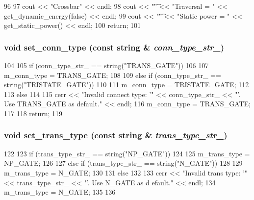 \begin{DoxyCode}
96 {
97     cout << "Crossbar" << endl;
98     cout << "\t" << "Traversal = " << get_dynamic_energy(false) << endl;
99     cout << "\t" << "Static power = " << get_static_power() << endl;
100     return;
101 }
\end{DoxyCode}
\hypertarget{classCrossbar_a877bc55ee39e47325652ddafcc1234ca}{
\subsubsection[{set\_\-conn\_\-type}]{\setlength{\rightskip}{0pt plus 5cm}void set\_\-conn\_\-type (const string \& {\em conn\_\-type\_\-str\_\-})}}
\label{classCrossbar_a877bc55ee39e47325652ddafcc1234ca}



\begin{DoxyCode}
104 {
105     if (conn_type_str_ == string("TRANS_GATE"))
106     {
107         m_conn_type = TRANS_GATE;
108     }
109     else if (conn_type_str_ == string("TRISTATE_GATE"))
110     {
111         m_conn_type = TRISTATE_GATE;
112     }
113     else
114     {
115         cerr << "Invalid connect type: '" << conn_type_str_ << "'. Use TRANS_GATE
       as default." << endl;
116         m_conn_type = TRANS_GATE;
117     }
118     return;
119 }
\end{DoxyCode}
\hypertarget{classCrossbar_a9a281542cf2d88f7728b825e0aa5a926}{
\subsubsection[{set\_\-trans\_\-type}]{\setlength{\rightskip}{0pt plus 5cm}void set\_\-trans\_\-type (const string \& {\em trans\_\-type\_\-str\_\-})}}
\label{classCrossbar_a9a281542cf2d88f7728b825e0aa5a926}



\begin{DoxyCode}
122 {
123     if (trans_type_str_ == string("NP_GATE"))
124     {
125         m_trans_type = NP_GATE;
126     }
127     else if (trans_type_str_ == string("N_GATE"))
128     {
129         m_trans_type = N_GATE;
130     }
131     else
132     {
133         cerr << "Invalid trans type: '" << trans_type_str_ << "'. Use N_GATE as d
      efault." << endl;
134         m_trans_type = N_GATE;
135     }
136 }
\end{DoxyCode}


